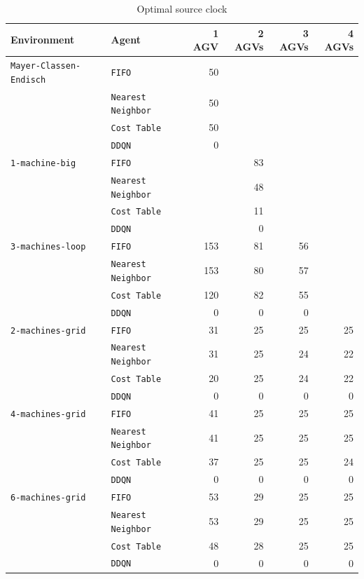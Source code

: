 \documentclass[sn-mathphys]{sn-jnl}
\begin{document}
\begin{table}[ht]
\centering
\bgroup
\def\arraystretch{1.1} %
    
\begin{tabular}{|l|l||r|r|r|r|}
\hline
Environment & Agent & 1 AGV & 2 AGVs & 3 AGVs & 4 AGVs \\
\hline \texttt{Mayer-Classen-Endisch} & \texttt{FIFO}& 50  \quad & & &  \\ 
 & \texttt{Nearest Neighbor} & 50  \quad & & &  \\ 
 & \texttt{Cost Table} & 50  \quad & & &  \\ 
 & \texttt{DDQN} & 0  \quad & & &  \\ 
\hline \texttt{1-machine-big} & \texttt{FIFO}& & 83  \quad & &  \\ 
 & \texttt{Nearest Neighbor} & & 48  \quad & &  \\ 
 & \texttt{Cost Table} & & 11  \quad & &  \\ 
 & \texttt{DDQN} & & 0  \quad & &  \\ 
\hline \texttt{3-machines-loop} & \texttt{FIFO}& 153  \quad & 81  \quad & 56  \quad &  \\ 
 & \texttt{Nearest Neighbor} & 153  \quad & 80  \quad & 57  \quad &  \\ 
 & \texttt{Cost Table} & 120  \quad & 82  \quad & 55  \quad &  \\ 
 & \texttt{DDQN} & 0  \quad & 0  \quad & 0  \quad &  \\ 
\hline \texttt{2-machines-grid} & \texttt{FIFO}& 31  \quad & 25  \quad & 25  \quad & 25  \quad  \\ 
 & \texttt{Nearest Neighbor} & 31  \quad & 25  \quad & 24  \quad & 22  \quad  \\ 
 & \texttt{Cost Table} & 20  \quad & 25  \quad & 24  \quad & 22  \quad  \\ 
 & \texttt{DDQN} & 0  \quad & 0  \quad & 0  \quad & 0  \quad  \\ 
\hline \texttt{4-machines-grid} & \texttt{FIFO}& 41  \quad & 25  \quad & 25  \quad & 25  \quad  \\ 
 & \texttt{Nearest Neighbor} & 41  \quad & 25  \quad & 25  \quad & 25  \quad  \\ 
 & \texttt{Cost Table} & 37  \quad & 25  \quad & 25  \quad & 24  \quad  \\ 
 & \texttt{DDQN} & 0  \quad & 0  \quad & 0  \quad & 0  \quad  \\ 
\hline \texttt{6-machines-grid} & \texttt{FIFO}& 53  \quad & 29  \quad & 25  \quad & 25  \quad  \\ 
 & \texttt{Nearest Neighbor} & 53  \quad & 29  \quad & 25  \quad & 25  \quad  \\ 
 & \texttt{Cost Table} & 48  \quad & 28  \quad & 25  \quad & 25  \quad  \\ 
 & \texttt{DDQN} & 0  \quad & 0  \quad & 0  \quad & 0  \quad  \\ 
\hline
\end{tabular}

\egroup
\caption{Optimal source clock}
\label{tab:results_optimal_clock}
\end{table}
    
\end{document}
